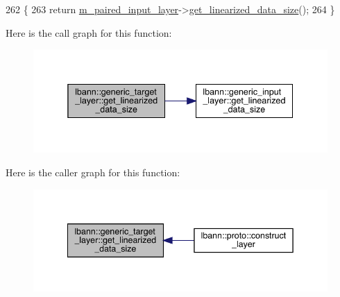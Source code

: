 \begin{DoxyCode}
262                                                  \{
263     \textcolor{keywordflow}{return} \hyperlink{classlbann_1_1generic__target__layer_a84da1260e9feb4fbc3e6f2315e4cab4b}{m\_paired\_input\_layer}->\hyperlink{classlbann_1_1generic__input__layer_aca46cbf29ad2762e9329b46ab2ad1ae7}{get\_linearized\_data\_size}();
264   \}
\end{DoxyCode}
Here is the call graph for this function\+:\nopagebreak
\begin{figure}[H]
\begin{center}
\leavevmode
\includegraphics[width=338pt]{classlbann_1_1generic__target__layer_a26376bcc04f9c8ec35ff99bd71de43d9_cgraph}
\end{center}
\end{figure}
Here is the caller graph for this function\+:\nopagebreak
\begin{figure}[H]
\begin{center}
\leavevmode
\includegraphics[width=342pt]{classlbann_1_1generic__target__layer_a26376bcc04f9c8ec35ff99bd71de43d9_icgraph}
\end{center}
\end{figure}
\mbox{\label{classlbann_1_1generic__target__layer_a8a266291fb01fbcec5cac5fefdef56eb}} 
